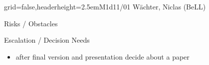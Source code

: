 \documentclass[english]{kiesgrube}
\begin{document}
\begin{poster}{grid=false,headerheight=2.5em}{}{M1d11/01 Wächter, Niclas (BeLL)}{}{}
\begin{posterbox}[name=risks,column=1,below=open]{Risks / Obstacles}
\end{posterbox}
\begin{posterbox}[name=escalation,column=1,below=risks]{Escalation / Decision Needs}
\begin{itemize}
\item after final version and presentation decide about a paper
\end{itemize}
\end{posterbox}
\footer{}
\end{poster}

\newpage
\end{document}
